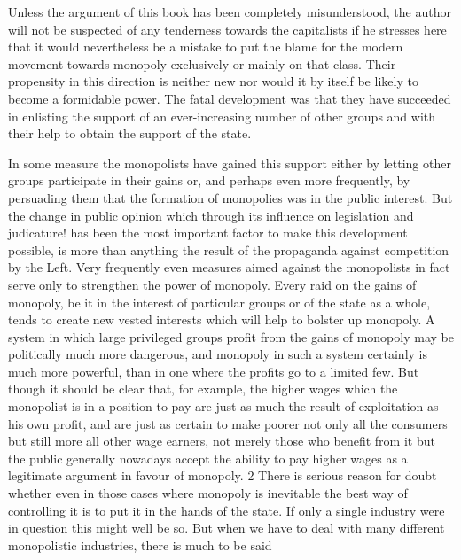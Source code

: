 \documentclass[11pt,openany]{book}
\begin{document}
Unless the argument of this book has been completely misunderstood, the author will not be suspected of any tenderness towards the capitalists if he stresses here that it would nevertheless be a mistake to put the blame for the modern movement towards monopoly exclusively or mainly on that class. Their propensity in this direction is neither new nor would it by itself be likely to become a formidable power. The fatal development was that they have succeeded in enlisting the support of an ever-increasing number of other groups and with their help to obtain the support of the state.

In some measure the monopolists have gained this support either by letting other groups participate in their gains or, and perhaps even more frequently, by persuading them that the formation of monopolies was in the public interest. But the change in public opinion which through its influence on legislation and judicature! has been the most important factor to make this development possible, is more than anything the result of the propaganda against competition by the Left. Very frequently even measures aimed against the monopolists in fact serve only to strengthen the power of monopoly. Every raid on the gains of monopoly, be it in the interest of particular groups or of the state as a whole, tends to create new vested interests which will help to bolster up monopoly. A system in which large privileged groups profit from the gains of monopoly may be politically much more dangerous, and monopoly in such a system certainly is much more powerful, than in one where the profits go to a limited few. But though it should be clear that, for example, the higher wages which the monopolist is in a position to pay are just as much the result of exploitation as his own profit, and are just as certain to make poorer not only all the consumers but still more all other wage earners, not merely those who benefit from it but the public generally nowadays accept the ability to pay higher wages as a legitimate argument in favour of monopoly. 2 There is serious reason for doubt whether even in those cases where monopoly is inevitable the best way of controlling it is to put it in the hands of the state. If only a single industry were in question this might well be so. But when we have to deal with many different monopolistic industries, there is much to be said
\end{document}
